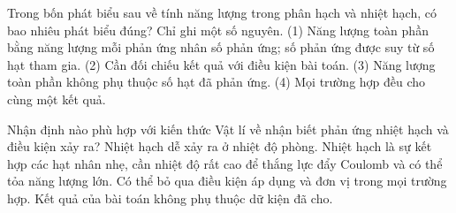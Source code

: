 \begin{ex}
Trong bốn phát biểu sau về tính năng lượng trong phân hạch và nhiệt hạch, có bao nhiêu phát biểu đúng? Chỉ ghi một số nguyên. (1) Năng lượng toàn phần bằng năng lượng mỗi phản ứng nhân số phản ứng; số phản ứng được suy từ số hạt tham gia. (2) Cần đối chiếu kết quả với điều kiện bài toán. (3) Năng lượng toàn phần không phụ thuộc số hạt đã phản ứng. (4) Mọi trường hợp đều cho cùng một kết quả.
\end{ex}

\begin{ex}
Nhận định nào phù hợp với kiến thức Vật lí về nhận biết phản ứng nhiệt hạch và điều kiện xảy ra?
\choice
{Nhiệt hạch dễ xảy ra ở nhiệt độ phòng.}
{\True Nhiệt hạch là sự kết hợp các hạt nhân nhẹ, cần nhiệt độ rất cao để thắng lực đẩy Coulomb và có thể tỏa năng lượng lớn.}
{Có thể bỏ qua điều kiện áp dụng và đơn vị trong mọi trường hợp.}
{Kết quả của bài toán không phụ thuộc dữ kiện đã cho.}
\end{ex}

